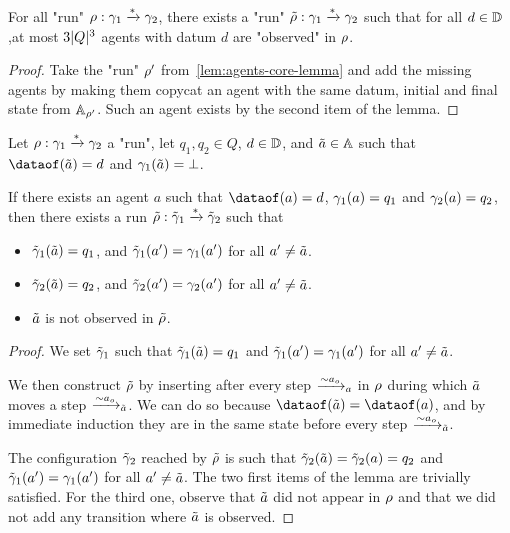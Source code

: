 \begin{corollary}
	For all "run" $\run : \config_1 \xrightarrow{*} \config_2$, there exists a "run" $\Tilde{\run} : \config_1 \xrightarrow{*} \config_2$ such that for all $d \in \Dataset$,at most $3\size{Q}^3$ agents with datum $d$ are "observed" in $\run$.
\end{corollary}

\begin{proof}
	Take the "run" $\run'$ from~\cref{lem:agents-core-lemma} and add the missing agents by making them copycat an agent with the same datum, initial and final state from $\Agentset_{\run'}$. Such an agent exists by the second item of the lemma.
\end{proof}

\begin{lemma}
	\label{lem:agents-copycat}
	Let  $\run : \config_1 \xrightarrow{*} \config_2$ a "run", let $q_1, q_2 \in Q$,  $d \in \Dataset$, and  $\Tilde{a} \in \Agentset$ such that $\dataof(\Tilde{a}) = d$ and $\config_1(\Tilde{a}) = \bot$. 
	
	If there exists an agent $a$ such that $\dataof(a)=d$, $\config_1(a) = q_1$ and $\config_2(a) = q_2$, then there exists a run $\Tilde{\run} : \Tilde{\config}_1 \xrightarrow{*} \Tilde{\config}_2$ such that
	\begin{itemize}
		\item $\Tilde{\config}_1(\Tilde{a}) = q_1$, and $\Tilde{\config}_1(a') = \config_1(a')$ for all $a' \neq \Tilde{a}$.
		
		\item $\Tilde{\config}_2(\Tilde{a}) = q_2$, and $\Tilde{\config}_2(a') = \config_2(a')$ for all $a' \neq \Tilde{a}$.
		
		\item $\Tilde{a}$ is not observed in $\Tilde{\run}$.
	\end{itemize}
\end{lemma}

\begin{proof}
	We set $\Tilde{\config}_1$ such that $\Tilde{\config}_1(\Tilde{a}) = q_1$ and $\Tilde{\config}_1(a') = \config_1(a')$ for all $a' \neq \Tilde{a}$.
	
	We then construct $\Tilde{\run}$ by inserting after every step $\step{\sim}{a}{a_o}$ in $\run$ during which $\Tilde{a}$ moves a step
	$\step{\sim}{\Tilde{a}}{a_o}$.
	We can do so because $\dataof(\Tilde{a})=\dataof(a)$, and by immediate induction they are in the same state before every step $\step{\sim}{\Tilde{a}}{a_o}$.
	
	The configuration $\Tilde{\config}_2$ reached by $\Tilde{\run}$ is such that $\Tilde{\config}_2(\Tilde{a}) = \Tilde{\config}_2(a) = q_2$ and $\Tilde{\config}_1(a') = \config_1(a')$ for all $a' \neq \Tilde{a}$. The two first items of the lemma are trivially satisfied.
	For the third one, observe that $\Tilde{a}$ did not appear in $\run$ and that we did not add any transition where $\Tilde{a}$ is observed.
\end{proof}


